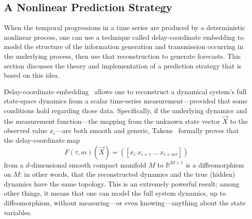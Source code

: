 \documentclass[%
pre,
reprint,
superscriptaddress,
showpacs,
nofootinbib,
nobibnotes,
 amsmath,amssymb,
 aps,
]{revtex4-1}
\begin{document}
\subsection{A Nonlinear Prediction Strategy}
\label{sec:lma}

When the temporal progressions in a time series are produced by a
deterministic nonlinear process, one can use a technique called
delay-coordinate embedding
%
%
to model the structure of the information generation and transmission
occurring in the underlying process, then use that reconstruction to
generate forecasts.  This section discusses the theory and
implementation of a prediction strategy that is based on this idea.

Delay-coordinate embedding~\cite{packard80,Sauer:1991lr,Takens:1981uq}
allows one to reconstruct a dynamical system's full state-space
dynamics from a scalar time-series measurement---provided that some
conditions hold regarding those data.  Specifically, if the underlying
dynamics and the measurement function---the mapping from the unknown
state vector $\vec{X}$ to the observed value $x_i$---are both smooth
and generic, Takens~\cite{Takens:1981uq} formally proves that the
delay-coordinate map
\[
F(\tau,m)(\vec{X}) = ([x_{i} ~ x_{i+\tau} ~ \dots ~x_{i+m\tau}])
\]
from a $d$-dimensional smooth compact manifold $M$ to
$\mathbb{R}^{2d+1}$ is a diffeomorphism on $M$: in other words, that
the reconstructed dynamics and the true (hidden) dynamics have the
same topology.  This is an extremely powerful result; among other
things, it means that one can model the full system dynamics, up to
diffeomorphism, without measuring---or even knowing---anything about
the state variables.
\end{document}
